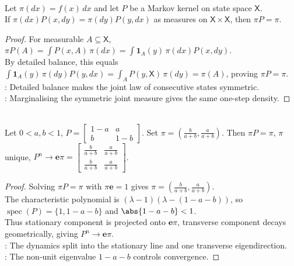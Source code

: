 \begin{proposition} \label{prop:detailed-balance-implies-stationarity} \\
Let $\pi(dx)=f(x)\,dx$ and let $P$ be a Markov kernel on state space $\mathsf{X}$.\\
If $\pi(dx)P(x,dy)=\pi(dy)P(y,dx)$ as measures on $\mathsf{X}\times\mathsf{X}$, then $\pi P=\pi$.
\begin{proof}
For measurable $A\subseteq\mathsf{X}$, $\pi P(A)=\int P(x,A)\,\pi(dx)=\int \mathbf{1}_A(y)\,\pi(dx)P(x,dy)$.\\
By detailed balance, this equals $\int \mathbf{1}_A(y)\,\pi(dy)P(y,dx)=\int_A P(y,\mathsf{X})\,\pi(dy)=\pi(A)$, proving $\pi P=\pi$.\\
: Detailed balance makes the joint law of consecutive states symmetric.\\
: Marginalising the symmetric joint measure gives the same one-step density.
\end{proof}
\end{proposition}

\begin{proposition} \label{prop:two-state-chain-limit} \\
Let $0<a,b<1$, $P=\begin{bmatrix}
1-a&a\\
b&1-b
\end{bmatrix}$. Set $\pi=\left(\frac{b}{a+b},\frac{a}{a+b}\right)$. Then $\pi P=\pi$, $\pi$ unique, $P^n\to\mathbf{e}\pi=
\begin{bmatrix}
\frac{b}{a+b}&\frac{a}{a+b}\\
\frac{b}{a+b}&\frac{a}{a+b}
\end{bmatrix}$.
\begin{proof} Solving $\pi P=\pi$ with $\pi\mathbf{e}=1$ gives $\pi=\left(\frac{b}{a+b},\frac{a}{a+b}\right)$.\\
The characteristic polynomial is $(\lambda-1)(\lambda-(1-a-b))$, so $\operatorname{spec}(P)=\{1,1-a-b\}$ and $\abs{1-a-b}<1$.\\
Thus stationary component is projected onto $\mathbf{e}\pi$, transverse component decays geometrically, giving $P^n\to\mathbf{e}\pi$.\\
: The dynamics split into the stationary line and one transverse eigendirection.\\
: The non-unit eigenvalue $1-a-b$ controls convergence.
\end{proof}
\end{proposition}
